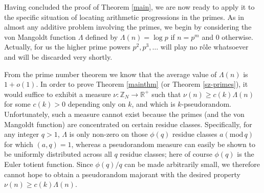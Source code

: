 \documentclass[12pt,a4paper,reqno]{amsart}
\numberwithin{equation}{section}
\theoremstyle{plain}
\theoremstyle{definition}
\renewcommand{\geq}{\geqslant}
\newcommand{\md}[1]{\ensuremath{(\mbox{mod}\, #1)}}
\def\vs{\vspace{11pt}}
\def\ni{\noindent}
\begin{document}
\ni Having concluded the proof of Theorem \ref{main}, we are now ready to apply it to the specific situation of locating arithmetic
progressions in the primes.  As in almost any additive problem involving the primes, we 
begin by considering the von Mangoldt function $\Lambda$ defined by $\Lambda(n) = \log p$ if $n = p^m$ and $0$ otherwise. 
Actually, for us the higher prime powers $p^2, p^3, \ldots$ will play no r\^ole whatsoever and will be discarded very shortly.\vs

\ni From the prime number theorem we know that the average value of $\Lambda(n)$ is $1 + o(1)$.
In order to prove Theorem \ref{mainthm} (or Theorem \ref{sz-primes}), it would suffice to exhibit a measure $\nu : \mathbb{Z}_N \rightarrow \mathbb{R}^{+}$ such that $\nu(n) \geq c(k)\Lambda(n)$ for some $c(k) > 0$ depending only on $k$, and which is $k$-pseudorandom.  Unfortunately, such a measure
cannot exist because the primes (and the von Mangoldt function) are concentrated on certain residue classes.  Specifically,
for any integer $q > 1$, $\Lambda$ is only non-zero on those $\phi(q)$ residue classes $a \md{q}$ for which $(a,q) = 1$, whereas
a pseudorandom measure can easily be shown to be uniformly distributed across all $q$ residue classes; here of course $\phi(q)$ is
the Euler totient function.  Since $\phi(q)/q$ can be made arbitrarily small, we therefore cannot hope to obtain a pseudorandom majorant
with the desired property $\nu(n) \geq c(k) \Lambda(n)$.\vs
\end{document}
